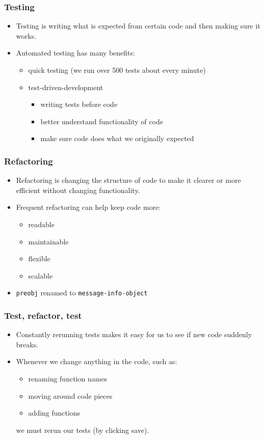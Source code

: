 \documentclass{beamer}
\begin{document}
\begin{frame}[fragile]
\frametitle{Testing}

\begin{itemize}
\item Testing is writing what is expected from certain code and then making sure it works.
\item Automated testing has many benefits:
\begin{itemize}
\item quick testing (we run over 500 tests about every minute)
\item test-driven-development
\begin{itemize}
\item writing tests before code
\item better understand functionality of code
\item make sure code does what we originally expected
\end{itemize}
\end{itemize}
\end{itemize}	
\end{frame}

\begin{frame}[fragile]
\frametitle{Refactoring}
\begin{itemize}
\item Refactoring is changing the structure of code to make it clearer or more efficient  without changing functionality.
\item Frequent refactoring can help keep code more: 
\begin{itemize}
\item readable
\item maintainable
\item flexible
\item scalable
\end{itemize}
\item {\tt preobj} renamed to {\tt message-info-object}
\end{itemize}	
\end{frame}

\begin{frame}[fragile]
\frametitle{Test, refactor, test}
\begin{itemize}
\item Constantly rerunning tests makes it easy for us to see if new code suddenly breaks.
\item Whenever we change anything in the code, such as:
\begin{itemize}
\item renaming function names
\item moving around code pieces
\item adding functions
\end{itemize}
we must rerun our tests (by clicking save).
\end{itemize}		
\end{frame}
\end{document}
